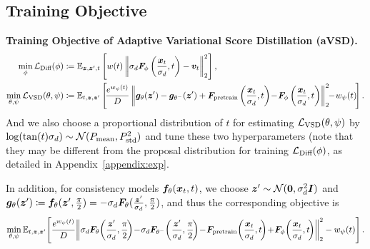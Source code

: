 \subsection{Training Objective}

\textbf{Training Objective of Adaptive Variational Score Distillation (aVSD). }
\begin{equation*}
\begin{aligned}
    \min_\phi\mathcal{L}_{\text{Diff}}(\phi)&\coloneqq \mathbb{E}_{{\bm{z}},{\bm{z}}',t}\left[
    w(t)\left\|
        \sigma_d {\bm{F}}_{\phi}\left(\frac{{\bm{x}}_t}{\sigma_d}, t\right) - {\bm{v}}_t    
    \right\|_2^2
    \right], \\
   \min_{\theta, \psi}\mathcal{L}_{\text{VSD}}(\theta,\psi) &\coloneqq \mathbb{E}_{t,{\bm{z}},{\bm{z}}'}\left[\!\frac{e^{w_{\psi}(t)}}{D}
    \left\|
         {\bm{g}}_\theta({\bm{z}}') - {\bm{g}}_{\theta^-}({\bm{z}}') + {\bm{F}}_{\text{pretrain}}\left(\frac{{\bm{x}}_t}{\sigma_d},t\right) \!-\! {\bm{F}}_\phi\left(\frac{{\bm{x}}_t}{\sigma_d},t\right)
    \right\|_2^2 \!\!- \!w_\psi(t)
    \!\right].
\end{aligned}
\end{equation*}
And we also choose a proportional distribution of $t$ for estimating ${\mathcal{L}}_{\text{VSD}}(\theta,\psi)$ by $\log(\tan(t)\sigma_d)\sim {\mathcal{N}}(P_{\text{mean}}, P_{\text{std}}^2)$ and tune these two hyperparameters (note that they may be different from the proposal distribution for training ${\mathcal{L}}_{\text{Diff}}(\phi)$, as detailed in Appendix~\ref{appendix:exp}.



In addition, for consistency models ${\bm{f}}_\theta({\bm{x}}_t,t)$, we choose ${\bm{z}}' \sim {\mathcal{N}}({\bm{0}}, \sigma_d^2{\bm{I}})$ and ${\bm{g}}_\theta({\bm{z}}') \coloneqq {\bm{f}}_\theta({\bm{z}}',\frac{\pi}{2}) = -\sigma_d {\bm{F}}_\theta(\frac{{\bm{z}}'}{\sigma_d}, \frac{\pi}{2})$, and thus the corresponding objective is
\begin{equation*}
    \min_{\theta, \psi} \E_{t,\z,\z'} \! \left[\frac{e^{w_{\psi}(t)}}{D}
    \!\left\|
         \sigma_d \F_\theta \! \left(\frac{\z'}{\sigma_d}, \frac{\pi}{2} \! \right)
         \!-\! \sigma_d \F_{\theta^-} \! \left(\frac{\z'}{\sigma_d}, \frac{\pi}{2} \! \right)
         \!-\! \F_{\text{pretrain}} \! \left(\frac{\x_t}{\sigma_d},t \! \right)
         \!+\! \F_\phi\! \left(\frac{\x_t}{\sigma_d},t \! \right)
    \right\|_2^2 - w_\psi(t)
    \right].
\end{equation*}



